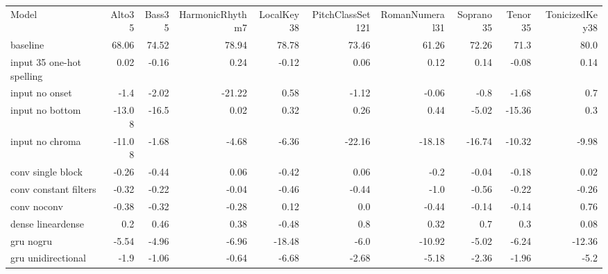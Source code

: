 \begin{tabular}{l|rrrrrrrrr}
Model                     	& Alto35 	& Bass35 	& HarmonicRhythm7 	& LocalKey38 	& PitchClassSet121  &	RomanNumeral31 & 	Soprano35 	& Tenor35 	& TonicizedKey38 \\
baseline                  	& 68.06  	& 74.52  	& 78.94           	& 78.78      	& 73.46             &	61.26          & 	72.26     	& 71.3    	& 80.0           \\
input 35 one-hot spelling 	& 0.02   	& -0.16  	& 0.24            	& -0.12      	& 0.06              &	0.12           & 	0.14      	& -0.08   	& 0.14           \\
input no onset            	& -1.4   	& -2.02  	& -21.22          	& 0.58       	& -1.12             &	-0.06          & 	-0.8      	& -1.68   	& 0.7            \\
input no bottom           	& -13.08 	& -16.5  	& 0.02            	& 0.32       	& 0.26              &	0.44           & 	-5.02     	& -15.36  	& 0.3            \\
input no chroma           	& -11.08 	& -1.68  	& -4.68           	& -6.36      	& -22.16            &	-18.18         & 	-16.74    	& -10.32  	& -9.98          \\
conv single block         	& -0.26  	& -0.44  	& 0.06            	& -0.42      	& 0.06              &	-0.2           & 	-0.04     	& -0.18   	& 0.02           \\
conv constant filters     	& -0.32  	& -0.22  	& -0.04           	& -0.46      	& -0.44             &	-1.0           & 	-0.56     	& -0.22   	& -0.26          \\
conv noconv               	& -0.38  	& -0.32  	& -0.28           	& 0.12       	& 0.0               &	-0.44          & 	-0.14     	& -0.14   	& 0.76           \\
dense lineardense         	& 0.2    	& 0.46   	& 0.38            	& -0.48      	& 0.8               &	0.32           & 	0.7       	& 0.3     	& 0.08           \\
gru nogru                 	& -5.54  	& -4.96  	& -6.96           	& -18.48     	& -6.0              &	-10.92         & 	-5.02     	& -6.24   	& -12.36         \\
gru unidirectional        	& -1.9   	& -1.06  	& -0.64           	& -6.68      	& -2.68             &	-5.18          & 	-2.36     	& -1.96   	& -5.2           \\
\end{tabular}

